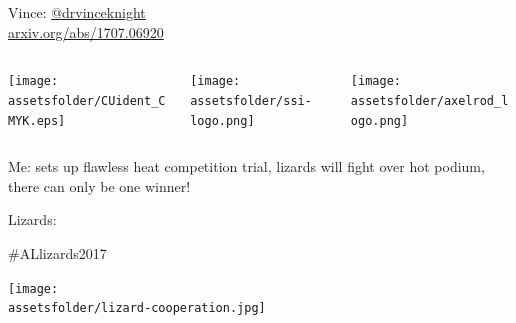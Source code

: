 \documentclass{beamer}
\newcommand{\assetsfolder}{./assets}
\begin{document}
    \begin{frame}
        \begin{center}
            \Large
               Vince: \href{https://twitter.com/drvinceknight}{@drvinceknight}\\

               \href{https://arxiv.org/abs/1707.06920}{arxiv.org/abs/1707.06920}
               \vfill
               \begin{columns}
                   \begin{column}{.3\textwidth}
                       \begin{center}
                       \texttt{[image: \\assetsfolder/CUident\_CMYK.eps]}
                       \end{center}
                   \end{column}
                   \begin{column}{.3\textwidth}
                       \begin{center}
                       \texttt{[image: \\assetsfolder/ssi-logo.png]}
                       \end{center}
                   \end{column}
                   \begin{column}{.3\textwidth}
                       \begin{center}
                       \texttt{[image: \\assetsfolder/axelrod\_logo.png]}
                       \end{center}
                   \end{column}
               \end{columns}
        \end{center}

    \end{frame}

    \begin{frame}
        \begin{center}
            \begin{tcolorbox}[colback=twitter,colframe=twitter!40!black,title=
                    \href{https://twitter.com/kirstyjean/status/870415613746962432}
                    {@kirstyjean} (2 Jun 2017):
]
                    Me: sets up flawless heat competition trial, lizards will
                    fight over hot podium, there can only be one winner!

                    Lizards:

                    \#ALlizards2017
           \end{tcolorbox}
        \end{center}
        \begin{center}
            \pause
            \texttt{[image: \\assetsfolder/lizard-cooperation.jpg]}
        \end{center}

    \end{frame}
\end{document}

